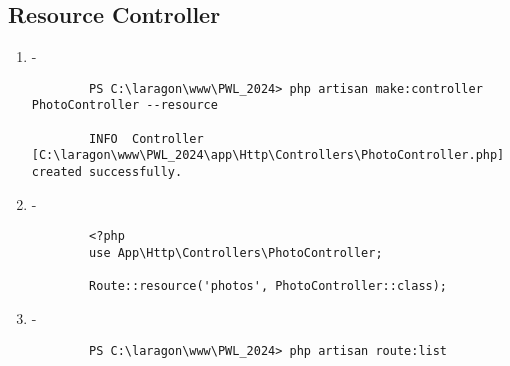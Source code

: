 \documentclass[12pt,titlepage]{article}
\begin{document}
\subsection{Resource Controller}
\begin{enumerate}[label=\alph*.]
    \item -
    \begin{verbatim}
        PS C:\laragon\www\PWL_2024> php artisan make:controller PhotoController --resource

        INFO  Controller [C:\laragon\www\PWL_2024\app\Http\Controllers\PhotoController.php] created successfully. 
    \end{verbatim}

    \item -
    \begin{verbatim}
        <?php
        use App\Http\Controllers\PhotoController;
        
        Route::resource('photos', PhotoController::class);
    \end{verbatim}
    \item -
    \begin{verbatim}
        PS C:\laragon\www\PWL_2024> php artisan route:list


\end{verbatim}
\end{enumerate}
\end{document}
